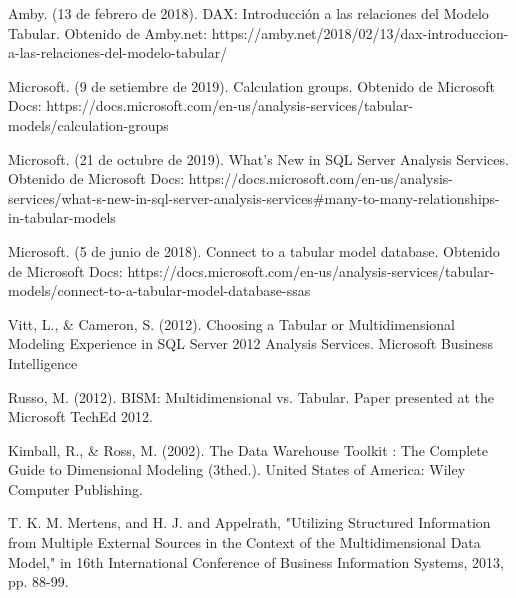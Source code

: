 \documentclass[twoside,twocolumn]{article}
\begin{document}
\begin{thebibliography}{99} 

\bibitem[1]{}
\newblock Amby. (13 de febrero de 2018). DAX: Introducción a las relaciones del Modelo Tabular. Obtenido de Amby.net: https://amby.net/2018/02/13/dax-introduccion-a-las-relaciones-del-modelo-tabular/

\bibitem[2]{}
\newblock Microsoft. (9 de setiembre de 2019). Calculation groups. Obtenido de Microsoft Docs: https://docs.microsoft.com/en-us/analysis-services/tabular-models/calculation-groups

\bibitem[3]{}
\newblock Microsoft. (21 de octubre de 2019). What's New in SQL Server Analysis Services. Obtenido de Microsoft Docs: https://docs.microsoft.com/en-us/analysis-services/what-s-new-in-sql-server-analysis-services\#many-to-many-relationships-in-tabular-models

\bibitem[4]{}
\newblock Microsoft. (5 de junio de 2018). Connect to a tabular model database. Obtenido de Microsoft Docs: https://docs.microsoft.com/en-us/analysis-services/tabular-models/connect-to-a-tabular-model-database-ssas

\bibitem[5]{}
\newblock Vitt, L., \& Cameron, S. (2012). Choosing a Tabular or Multidimensional Modeling Experience in SQL Server 2012 Analysis Services. Microsoft Business Intelligence

\bibitem[6]{}
\newblock Russo, M. (2012). BISM: Multidimensional vs. Tabular. Paper presented at the Microsoft TechEd 2012.

\bibitem[7]{}
\newblock Kimball, R., \& Ross, M. (2002). The Data Warehouse Toolkit : The Complete Guide to Dimensional Modeling (3thed.). United States of America: Wiley Computer Publishing.

\bibitem[8]{}
\newblock T. K. M. Mertens, and H. J. and Appelrath, "Utilizing Structured Information from Multiple External Sources in the Context of the Multidimensional Data Model," in 16th International Conference of Business Information Systems, 2013, pp. 88-99.



\end{thebibliography}


\end{document}
